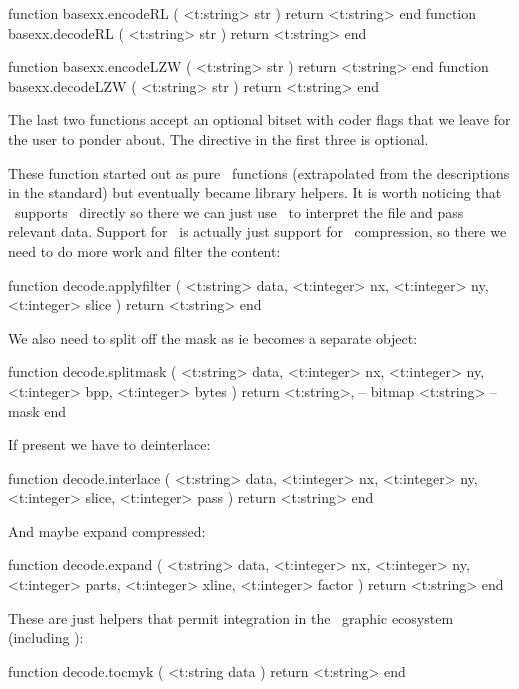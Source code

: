 function basexx.encodeRL  ( <t:string> str ) return <t:string> end
function basexx.decodeRL  ( <t:string> str ) return <t:string> end

function basexx.encodeLZW ( <t:string> str ) return <t:string> end
function basexx.decodeLZW ( <t:string> str ) return <t:string> end
\stoptyping

The last two functions accept an optional bitset with coder flags that we leave
for the user to ponder about. The  directive in the first three is
optional.

\stopsubsection

\startsubsection[title=\PNG\ decoding]

These function started out as pure \LUA\ functions (extrapolated from the
descriptions in the standard) but eventually became library helpers. It is
worth noticing that \PDF\ supports \JPEG\ directly so there we can just use
\LUA\ to interpret the file and pass relevant data. Support for \PNG\ is
actually just support for \PNG\ compression, so there we need to do more
work and filter the content:

\starttyping[option=LUA]
function decode.applyfilter (
    <t:string>  data,
    <t:integer> nx,
    <t:integer> ny,
    <t:integer> slice
)
    return <t:string>
end
\stoptyping

We also need to split off the mask as ie becomes a separate object:

\starttyping[option=LUA]
function decode.splitmask (
    <t:string>  data,
    <t:integer> nx,
    <t:integer> ny,
    <t:integer> bpp,
    <t:integer> bytes
)
    return
        <t:string>, -- bitmap
        <t:string>  -- mask
end
\stoptyping

If present we have to deinterlace:

\starttyping[option=LUA]
function decode.interlace (
    <t:string>  data,
    <t:integer> nx,
    <t:integer> ny,
    <t:integer> slice,
    <t:integer> pass
)
    return <t:string>
end
\stoptyping

And maybe expand compressed:

\starttyping[option=LUA]
function decode.expand (
    <t:string>  data,
    <t:integer> nx,
    <t:integer> ny,
    <t:integer> parts,
    <t:integer> xline,
    <t:integer> factor
)
    return <t:string>
end
\stoptyping

These are just helpers that permit integration in the \CONTEXT\ graphic
ecosystem (including \METAPOST):

\starttyping[option=LUA]
function decode.tocmyk ( <t:string data )
    return <t:string>
end
\stoptyping

